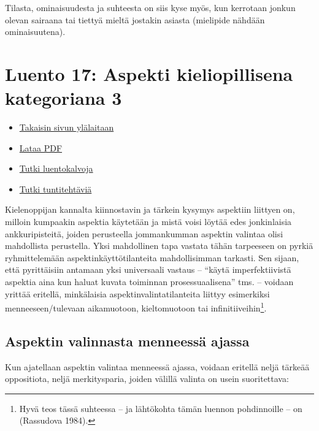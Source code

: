 \documentclass[]{scrartcl}
\providecommand{\tightlist}{%
  \setlength{\itemsep}{0pt}\setlength{\parskip}{0pt}}
\begin{document}
Tilasta, ominaisuudesta ja suhteesta on siis kyse myös, kun kerrotaan
jonkun olevan sairaana tai tiettyä mieltä jostakin asiasta (mielipide
nähdään ominaisuutena).

\section{Luento 17: Aspekti kieliopillisena kategoriana
3}\label{luento-17-aspekti-kieliopillisena-kategoriana-3}

\begin{itemize}
\tightlist
\item
  \href{https://mustikka.uta.fi/~juho_harme/morfologia/\#tästä-kurssista}{Takaisin
  sivun ylälaitaan}
\item
  \href{http://mustikka.uta.fi/~juho_harme/morfologia/materiaalit/luento17.pdf}{Lataa
  PDF}
\item
  \href{http://mustikka.uta.fi/~juho_harme/morfologia/presentations/luento17.html}{Tutki
  luentokalvoja}
\item
  \href{http://mustikka.uta.fi/~juho_harme/morfologia/tehtavat/luento17.pdf}{Tutki
  tuntitehtäviä}
\end{itemize}

Kielenoppijan kannalta kiinnostavin ja tärkein kysymys aspektiin
liittyen on, milloin kumpaakin aspektia käytetään ja mistä voisi löytää
edes jonkinlaisia ankkuripisteitä, joiden perusteella jommankumman
aspektin valintaa olisi mahdollista perustella. Yksi mahdollinen tapa
vastata tähän tarpeeseen on pyrkiä ryhmittelemään
aspektinkäyttötilanteita mahdollisimman tarkasti. Sen sijaan, että
pyrittäisiin antamaan yksi universaali vastaus -- ``käytä
imperfektiivistä aspektia aina kun haluat kuvata toiminnan
prosessuaalisena'' tms. -- voidaan yrittää eritellä, minkälaisia
aspektinvalintatilanteita liittyy esimerkiksi menneeseen/tulevaan
aikamuotoon, kieltomuotoon tai infinitiiveihin\footnote{Hyvä teos tässä
  suhteessa -- ja lähtökohta tämän luennon pohdinnoille -- on (Rassudova
  1984).}.

\subsection{Aspektin valinnasta menneessä
ajassa}\label{aspektin-valinnasta-menneessuxe4-ajassa}

Kun ajatellaan aspektin valintaa menneessä ajassa, voidaan eritellä
neljä tärkeää oppositiota, neljä merkitysparia, joiden välillä valinta
on usein suoritettava:
\end{document}
